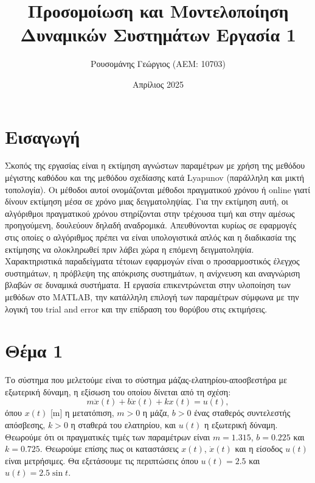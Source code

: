 \documentclass[a4paper,12pt]{article}
\title{Προσομοίωση και Μοντελοποίηση \newline Δυναμικών Συστημάτων \newline Εργασία 1}
\author{Ρουσομάνης Γεώργιος (ΑΕΜ: 10703)}
\date{Απρίλιος 2025}
\begin{document}
\maketitle

\section*{Εισαγωγή}
Σκοπός της εργασίας είναι η εκτίμηση αγνώστων παραμέτρων με χρήση της μεθόδου μέγιστης καθόδου και της 
μεθόδου σχεδίασης κατά Lyapunov (παράλληλη και μικτή τοπολογία).
Οι μέθοδοι αυτοί ονομάζονται μέθοδοι πραγματικού χρόνου ή online
γιατί δίνουν εκτίμηση μέσα σε χρόνο μιας δειγματοληψίας. Για την εκτίμηση αυτή, οι αλγόριθμοι πραγματικού 
χρόνου στηρίζονται στην τρέχουσα τιμή και στην αμέσως προηγούμενη, δουλεύουν δηλαδή αναδρομικά. Απευθύνονται
κυρίως σε εφαρμογές στις οποίες ο αλγόριθμος πρέπει να είναι υπολογιστικά απλός και η διαδικασία της εκτίμησης 
να ολοκληρωθεί πριν λάβει χώρα η επόμενη δειγματοληψία. Χαρακτηριστικά παραδείγματα τέτοιων εφαρμογών είναι ο 
προσαρμοστικός έλεγχος συστημάτων, η πρόβλεψη της απόκρισης συστημάτων, η ανίχνευση και αναγνώριση βλαβών σε 
δυναμικά συστήματα. Η εργασία επικεντρώνεται στην υλοποίηση των μεθόδων στο 
MATLAB, την κατάλληλη επιλογή των παραμέτρων σύμφωνα με την 
λογική του trial and error και την επίδραση του θορύβου στις
εκτιμήσεις.

\section*{Θέμα 1}
Το σύστημα που μελετούμε είναι το σύστημα μάζας-ελατηρίου-αποσβεστήρα με εξωτερική δύναμη, η εξίσωση του
οποίου δίνεται από τη σχέση:
\begin{equation}
    m \ddot{x}(t) + b \dot{x}(t) + k x(t) = u(t),
    \label{eq:system_ODE}
\end{equation}
όπου $x(t)$ [m] η μετατόπιση, $m>0$ η μάζα, $b>0$ ένας σταθερός 
συντελεστής απόσβεσης, $k>0$ η σταθερά του ελατηρίου, και $u(t)$ η εξωτερική δύναμη. Θεωρούμε ότι οι πραγματικές
τιμές των παραμέτρων είναι $m=1.315$, $b=0.225$ και $k=0.725$. Θεωρούμε επίσης πως οι καταστάσεις $x(t)$, 
$\dot{x}(t)$ και η είσοδος $u(t)$ είναι μετρήσιμες. Θα εξετάσουμε τις περιπτώσεις όπου $u(t) = 2.5$ και 
$u(t) = 2.5\sin t$.
\end{document}
